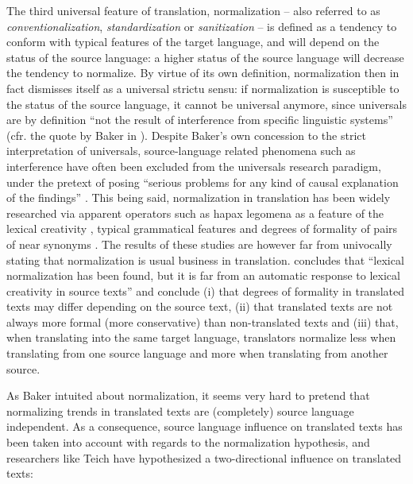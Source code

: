 The third universal feature of translation, normalization – also referred to as \textit{conventionalization}, \textit{standardization} or \textit{sanitization} \citep[23]{zanettin_corpus_2013} – is defined as a tendency to conform with typical features of the target language, and will depend on the status of the source language: a higher status of the source language will decrease the tendency to normalize. By virtue of its own definition, normalization then in fact dismisses itself as a universal strictu sensu: if normalization is susceptible to the status of the source language, it cannot be universal anymore, since universals are by definition “not the result of interference from specific linguistic systems” (cfr. the quote by Baker in ). Despite Baker’s own concession to the strict interpretation of universals, source-language related phenomena such as interference have often been excluded from the universals research paradigm, under the pretext of posing “serious problems for any kind of causal explanation of the findings” \citep[311]{pym_tourys_2008}. This being said, normalization in translation has been widely researched via apparent operators such as hapax legomena as a feature of the lexical creativity \citep{kenny_lexis_2001}, typical grammatical features \citep{kranich_between_2011} and degrees of formality of pairs of near synonyms  \citep{DeSutterEtAl2012}. The results of these studies are however far from univocally stating that normalization is usual business in translation. \citet[210]{kenny_lexis_2001} concludes that “lexical normalization has been found, but it is far from an automatic response to lexical creativity in source texts” and \citet[338]{oakes_lexical_2012} conclude (i) that degrees of formality in translated texts may differ depending on the source text, (ii) that translated texts are not always more formal (more conservative) than non-translated texts and (iii) that, when translating into the same target language, translators normalize less when translating from one source language and more when translating from another source.

As Baker intuited about normalization, it seems very hard to pretend that normalizing trends in translated texts are (completely) source language independent. As a consequence, source language influence on translated texts has been taken into account with regards to the normalization hypothesis, and researchers like Teich have hypothesized a two-directional influence on translated texts:

